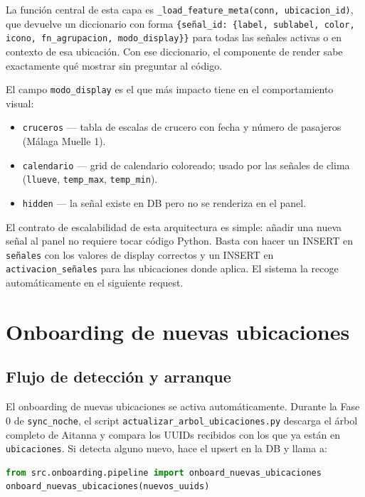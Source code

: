 \documentclass[12pt, a4paper]{article}
\begin{document}
La función central de esta capa es \texttt{\_load\_feature\_meta(conn, ubicacion\_id)}, que devuelve un diccionario con forma \texttt{\{señal\_id: \{label, sublabel, color, icono, fn\_agrupacion, modo\_display\}\}} para todas las señales activas o en contexto de esa ubicación. Con ese diccionario, el componente de render sabe exactamente qué mostrar sin preguntar al código.

El campo \texttt{modo\_display} es el que más impacto tiene en el comportamiento visual:

\begin{itemize}
  \item \texttt{cruceros} — tabla de escalas de crucero con fecha y número de pasajeros (Málaga Muelle 1).
  \item \texttt{calendario} — grid de calendario coloreado; usado por las señales de clima (\texttt{llueve}, \texttt{temp\_max}, \texttt{temp\_min}).
  \item \texttt{hidden} — la señal existe en DB pero no se renderiza en el panel.
\end{itemize}

El contrato de escalabilidad de esta arquitectura es simple: añadir una nueva señal al panel no requiere tocar código Python. Basta con hacer un INSERT en \texttt{señales} con los valores de display correctos y un INSERT en \texttt{activacion\_señales} para las ubicaciones donde aplica. El sistema la recoge automáticamente en el siguiente request.

\section{Onboarding de nuevas ubicaciones}

\subsection{Flujo de detección y arranque}

El onboarding de nuevas ubicaciones se activa automáticamente. Durante la Fase 0 de \texttt{sync\_noche}, el script \texttt{actualizar\_arbol\_ubicaciones.py} descarga el árbol completo de Aitanna y compara los UUIDs recibidos con los que ya están en \texttt{ubicaciones}. Si detecta alguno nuevo, hace el upsert en la DB y llama a:

\begin{lstlisting}[language=Python]
from src.onboarding.pipeline import onboard_nuevas_ubicaciones
onboard_nuevas_ubicaciones(nuevos_uuids)
\end{lstlisting}
\end{document}
